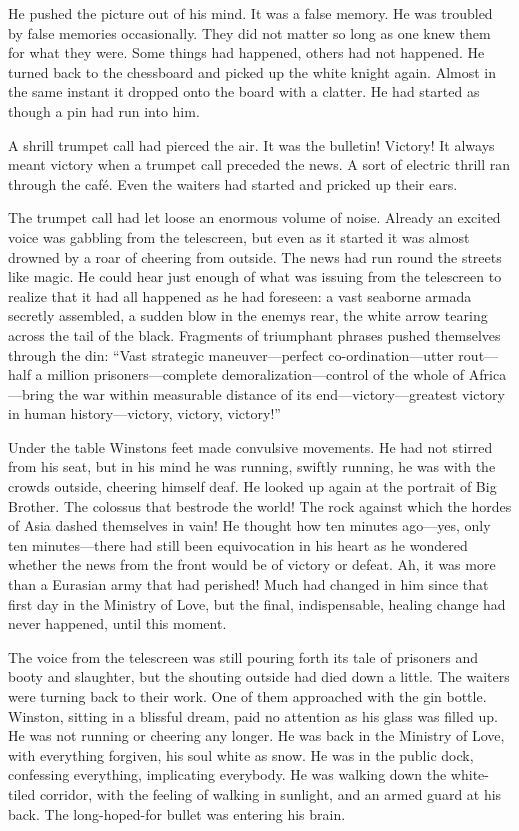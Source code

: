 He pushed the picture out of his mind. It was a false memory. He was
troubled by false memories occasionally. They did not matter so long as
one knew them for what they were. Some things had happened, others had
not happened. He turned back to the chessboard and picked up the white
knight again. Almost in the same instant it dropped onto the board with
a clatter. He had started as though a pin had run into him.

A shrill trumpet call had pierced the air. It was the bulletin! Victory!
It always meant victory when a trumpet call preceded the news. A sort of
electric thrill ran through the café. Even the waiters had started and
pricked up their ears.

The trumpet call had let loose an enormous volume of noise. Already an
excited voice was gabbling from the telescreen, but even as it started
it was almost drowned by a roar of cheering from outside. The news had
run round the streets like magic. He could hear just enough of what was
issuing from the telescreen to realize that it had all happened as he
had foreseen: a vast seaborne armada secretly assembled, a sudden blow
in the enemy\textquotesingle s rear, the white arrow tearing across the
tail of the black. Fragments of triumphant phrases pushed themselves
through the din: ``Vast strategic maneuver---perfect
co-ordination---utter rout---half a million prisoners---complete
demoralization---control of the whole of Africa---bring the war within
measurable distance of its end---victory---greatest victory in human
history---victory, victory, victory!''

Under the table Winston\textquotesingle s feet made convulsive
movements. He had not stirred from his seat, but in his mind he was
running, swiftly running, he was with the crowds outside, cheering
himself deaf. He looked up again at the portrait of Big Brother. The
colossus that bestrode the world! The rock against which the hordes of
Asia dashed themselves in vain! He thought how ten minutes ago---yes,
only ten minutes---there had still been equivocation in his heart as he
wondered whether the news from the front would be of victory or defeat.
Ah, it was more than a Eurasian army that had perished! Much had changed
in him since that first day in the Ministry of Love, but the final,
indispensable, healing change had never happened, until this moment.

The voice from the telescreen was still pouring forth its tale of
prisoners and booty and slaughter, but the shouting outside had died
down a little. The waiters were turning back to their work. One of them
approached with the gin bottle. Winston, sitting in a blissful dream,
paid no attention as his glass was filled up. He was not running or
cheering any longer. He was back in the Ministry of Love, with
everything forgiven, his soul white as snow. He was in the public dock,
confessing everything, implicating everybody. He was walking down the
white-tiled corridor, with the feeling of walking in sunlight, and an
armed guard at his back. The long-hoped-for bullet was entering his
brain.

